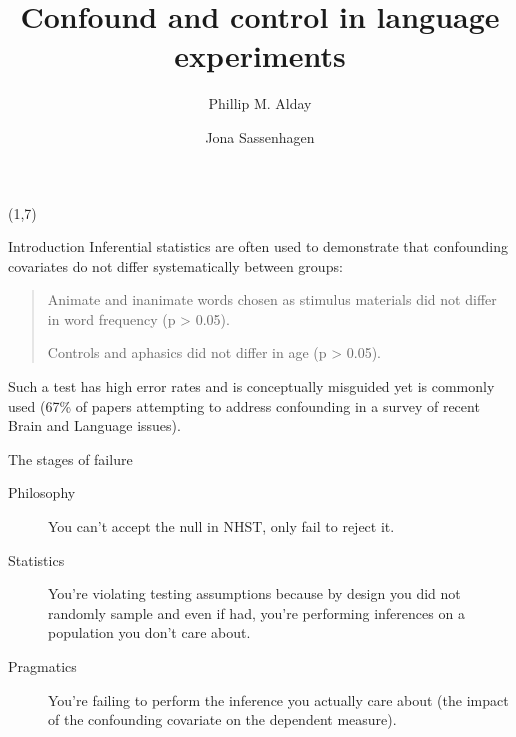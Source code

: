 \documentclass[final]{beamer}
\title{Confound and control in language experiments}
\author{Phillip M. Alday  \and Jona Sassenhagen}
\institute{University of South Australia}
\date{}
\begin{document}
\begin{frame}{} 	


\begin{textblock}{48}(1,7)

\begin{block}{Introduction}
Inferential statistics are often used to demonstrate that  confounding covariates do not differ systematically between groups:

\begin{quote}
Animate and inanimate words chosen as stimulus materials did not differ in word frequency (p > 0.05).

Controls and aphasics did not differ in age (p > 0.05).
\end{quote}


Such a test has high error rates and is conceptually misguided yet is commonly used (67\% of papers attempting to address confounding in a survey of recent Brain and Language issues).
\end{block}

\begin{block}{The stages of failure}
\begin{description}
\item[Philosophy] You can’t accept the null in NHST, only fail to reject it.
\item[Statistics] You’re violating testing assumptions because by design you did not randomly sample and even if had, you're performing inferences on a population you don’t care about.
\item[Pragmatics] You’re failing to perform the inference you actually care about (the impact of the confounding covariate on the dependent measure).
\end{description}
\end{block}


\end{textblock}
\end{frame}
\end{document}

